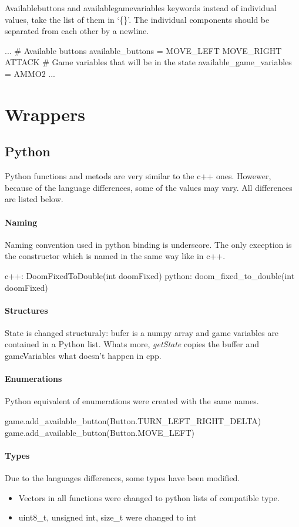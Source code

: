 Availablebuttons and availablegamevariables keywords instead of individual values, take the list of them in `\{\}'. The individual components should be separated from each other by a newline.
\begin{pblock}
...
# Available buttons
available_buttons = 
	{ 
		MOVE_LEFT 
		MOVE_RIGHT 
		ATTACK 
	}
# Game variables that will be in the state
available_game_variables = { AMMO2}
...
\end{pblock}

\section{Wrappers}
\subsection{Python}

Python functions and metods are very similar to the c++ ones. Howewer, because of the language differences, some of the values may vary. All differences are listed below.

\paragraph {Naming}
Naming convention used in python binding is underscore. The only exception is the constructor which is named in the same way like in c++.

\begin{cblock}
c++: DoomFixedToDouble(int doomFixed)
python: doom_fixed_to_double(int doomFixed)
\end{cblock}


\paragraph {Structures}
 State is changed structuraly: bufer is a numpy array and game variables are contained in a Python list. Whats more, \emph{getState} copies the buffer and gameVariables what doesn't happen in cpp. 
\paragraph {Enumerations}
Python equivalent of enumerations were created with the same names.
\begin{cblock}
game.add_available_button(Button.TURN_LEFT_RIGHT_DELTA)
game.add_available_button(Button.MOVE_LEFT)
\end{cblock}
\paragraph {Types}
Due to the languages differences, some types have been modified.
\begin{itemize} 
\item Vectors in all functions were changed to python lists of compatible type.

\item  uint8\_t, unsigned int, size\_t were changed to int
\end{itemize}


